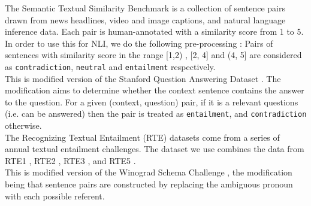  The Semantic Textual Similarity Benchmark \cite{cer-etal-2017-semeval} is a collection of sentence pairs drawn from news headlines, video and image captions, and natural language inference data. Each pair is human-annotated with a similarity score from 1 to 5. In order to use this for NLI, we do the following pre-processing : Pairs of sentences with similarity score in the range [1,2) , [2, 4] and (4, 5] are considered as \texttt{contradiction}, \texttt{neutral} and \texttt{entailment} respectively.\\

 This is modified version of the  Stanford Question Answering Dataset \cite{rajpurkar-etal-2018-know}. The modification aims to determine whether the context sentence contains the answer to the question. For a given (context, question) pair, if it is a relevant questions (i.e. can be answered) then the pair is treated as \texttt{entailment}, and \texttt{contradiction} otherwise. \\

 The Recognizing Textual Entailment (RTE) datasets come from a series of annual textual entailment challenges. The dataset we use combines the data from RTE1 \cite{dagan2005pascal}, RTE2 \cite{bar2006second}, RTE3 \cite{giampiccolo2007third}, and RTE5 \cite{bentivogli2009fifth}.\\

 This is modified version of the Winograd Schema Challenge \cite{levesque2012winograd}, the modification being that sentence pairs are constructed by replacing the ambiguous pronoun with each possible referent. \\




